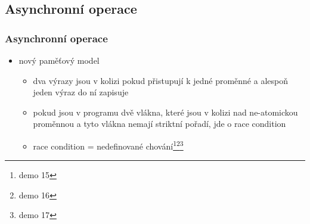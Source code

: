 \subsection{Asynchronní operace}

\begin{frame} \frametitle{Asynchronní operace}
	\begin{itemize}
		\item nový paměťový model
		\begin{itemize}
			\item dva výrazy jsou v kolizi pokud přistupují k jedné proměnné a alespoň jeden výraz do ní zapisuje
			\item pokud jsou v programu dvě vlákna, které jsou v kolizi nad ne-atomickou proměnnou a tyto vlákna nemají striktní pořadí, jde o race condition
			\item race condition = nedefinované chování\footnote{demo 15}\footnote{demo 16}\footnote{demo 17}
		\end{itemize}
	\end{itemize}
\end{frame}




